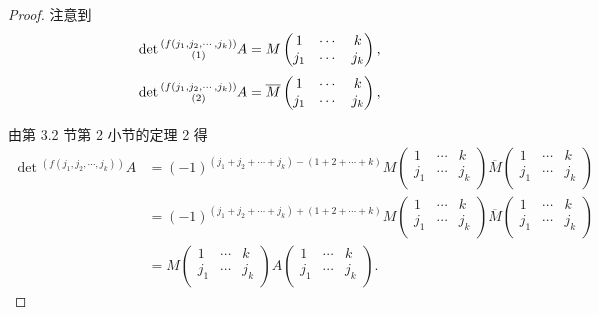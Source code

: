 \documentclass[color=black,device=normal,lang=cn,mode=geye]{elegantnote}
\begin{document}
\begin{proof}
    注意到
    \[\det\begin{subarray}{c}
    (f(j_1,j_2,\cdots,j_k)) \\
    (1)
    \end{subarray}A=M\begin{pmatrix}
        1 & \cdots & k \\
        j_1 & \cdots & j_k \\
    \end{pmatrix},\]
    \[\det\begin{subarray}{c}
    (f(j_1,j_2,\cdots,j_k)) \\
    (2)
    \end{subarray}A=\overline{M}\begin{pmatrix}
        1 & \cdots & k \\
        j_1 & \cdots & j_k \\
    \end{pmatrix},\]

    由第 3.2 节第 2 小节的定理 2 得
    \begin{align*}
        \det{}^{(f(j_1,j_2,\cdots,j_k))}A & =(-1)^{(j_1+j_2+\cdots+j_k)-(1+2+\cdots+k)}M\begin{pmatrix}
            1 & \cdots & k \\
            j_1 & \cdots & j_k \\
        \end{pmatrix}\overline{M}\begin{pmatrix}
            1 & \cdots & k \\
            j_1 & \cdots & j_k \\
        \end{pmatrix} \\
        & =(-1)^{(j_1+j_2+\cdots+j_k)+(1+2+\cdots+k)}M\begin{pmatrix}
            1 & \cdots & k \\
            j_1 & \cdots & j_k \\
        \end{pmatrix}\overline{M}\begin{pmatrix}
            1 & \cdots & k \\
            j_1 & \cdots & j_k \\
        \end{pmatrix} \\
        & =M\begin{pmatrix}
            1 & \cdots & k \\
            j_1 & \cdots & j_k \\
        \end{pmatrix}A\begin{pmatrix}
            1 & \cdots & k \\
            j_1 & \cdots & j_k \\
        \end{pmatrix}.
    \end{align*}


\end{proof}
\end{document}
